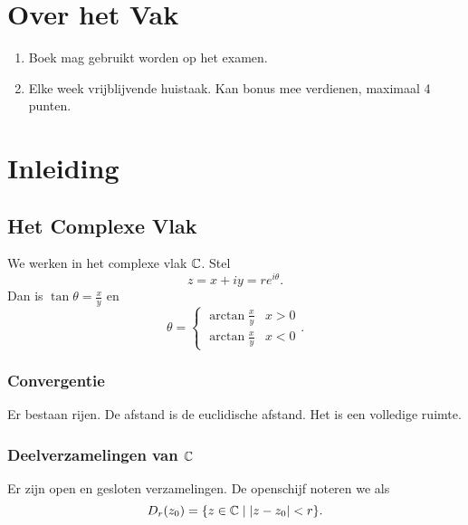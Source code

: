 
\setcounter{chapter}{-1}
\chapter{Over het Vak} \label{chap:over_het_vak}

\begin{enumerate}
	\item Boek mag gebruikt worden op het examen.
	\item Elke week vrijblijvende huistaak. Kan bonus mee verdienen, maximaal 4 punten.
\end{enumerate}

\chapter{Inleiding} \label{chap:inleiding}
\section{Het Complexe Vlak} \label{sec:het_complexe_vlak}

We werken in het complexe vlak $\mathbb{C}$. 
Stel \[
z = x + iy = re^{i\theta}
.\] 
Dan is $\tan \theta = \frac{x}{y}$ en \[
\theta = \begin{cases}
	\arctan \frac{x}{y} & x>0\\
	\arctan \frac{x}{y} & x < 0
\end{cases}
.\] 

\subsection{Convergentie} \label{sec:convergentie}
Er bestaan rijen. De afstand is de euclidische afstand.
Het is een volledige ruimte.

\subsection{Deelverzamelingen van $\mathbb{C}$} \label{sec:deelverzamelingen_van_$\c$}
Er zijn open en gesloten verzamelingen. De openschijf noteren we als \[
	D_r(z_0) = \{z \in \mathbb{C} \;|\; |z - z_0| < r\} 
.\]

